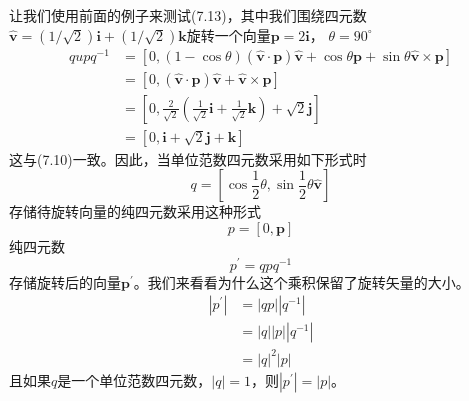 让我们使用前面的例子来测试(7.13)，其中我们围绕四元数$\hat{\mathbf{v}}=(1 / \sqrt{2}) \mathbf{i}+(1 / \sqrt{2}) \mathbf{k}$旋转一个向量$\mathbf{p}=2 \mathbf{i}$， $\theta=90^{\circ}$
$$
\begin{aligned}
q u p q^{-1} & =[0,(1-\cos \theta)(\hat{\mathbf{v}} \cdot \mathbf{p}) \hat{\mathbf{v}}+\cos \theta \mathbf{p}+\sin \theta \hat{\mathbf{v}} \times \mathbf{p}] \\
& =[0,(\hat{\mathbf{v}} \cdot \mathbf{p}) \hat{\mathbf{v}}+\hat{\mathbf{v}} \times \mathbf{p}] \\
& =\left[0, \frac{2}{\sqrt{2}}\left(\frac{1}{\sqrt{2}} \mathbf{i}+\frac{1}{\sqrt{2}} \mathbf{k}\right)+\sqrt{2} \mathbf{j}\right] \\
& =[0, \mathbf{i}+\sqrt{2} \mathbf{j}+\mathbf{k}]
\end{aligned}
$$
这与(7.10)一致。因此，当单位范数四元数采用如下形式时
$$
q=\left[\cos \frac{1}{2} \theta, \sin \frac{1}{2} \theta \hat{\mathbf{v}}\right]
$$
存储待旋转向量的纯四元数采用这种形式
$$
p=[0, \mathbf{p}]
$$
纯四元数
$$
p^{\prime}=q p q^{-1}
$$
存储旋转后的向量$\mathbf{p}^{\prime}$。我们来看看为什么这个乘积保留了旋转矢量的大小。
$$
\begin{aligned}
\left|p^{\prime}\right| & =|q p|\left|q^{-1}\right| \\
& =|q||p|\left|q^{-1}\right| \\
& =|q|^{2}|p|
\end{aligned}
$$
且如果$q$是一个单位范数四元数，$|q|=1$，则$\left|p^{\prime}\right|=|p|$。

